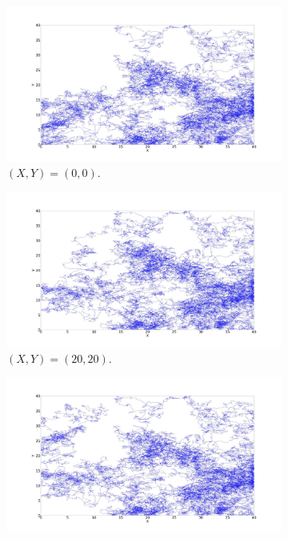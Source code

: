 \begin{figure}[ht]
	\centering
	\begin{subfigure}[b]{0.55\textwidth}
		\centering
		\includegraphics[width=\textwidth]{LateX images/log/XY1/g2-2.1}
		\caption{$(X,Y) = (0,0)$.}
		\label{f:g84}
	\end{subfigure}
	\hfill
	\begin{subfigure}[b]{0.55\textwidth}
		\centering
		\includegraphics[width=\textwidth]{LateX images/log/XY1/g3-2.1}
		\caption{$(X,Y) = (20,20)$.}
		\label{f:g85}
	\end{subfigure}
	\hfill
	\begin{subfigure}[b]{0.55\textwidth}
		\centering
		\includegraphics[width=\textwidth]{LateX images/log/XY1/g4-2.1}

\end{subfigure}
\end{figure}
